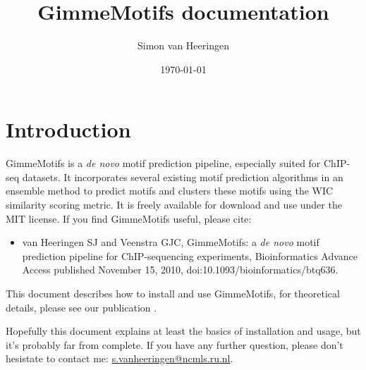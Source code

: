 \documentclass[11pt]{article}
\title{GimmeMotifs documentation}
\author{Simon van Heeringen}
\date{\today}
\begin{document}
\maketitle

\clearpage

\tableofcontents

\section{Introduction}
GimmeMotifs is a \textit{de novo} motif prediction pipeline, especially suited for ChIP-seq datasets. It incorporates several existing motif prediction algorithms in an ensemble method to predict motifs and clusters these motifs using the WIC similarity scoring metric. It is freely available for download and use under the MIT license. If you find GimmeMotifs useful, please cite:
\begin{itemize}
\item van Heeringen SJ and Veenstra GJC, GimmeMotifs: a \textit{de novo} motif prediction pipeline for ChIP-sequencing experiments, Bioinformatics Advance Access published November 15, 2010,
doi:10.1093/bioinformatics/btq636.
\end{itemize}
This document describes how to install and use GimmeMotifs, for theoretical details, please see our publication \cite{van_heeringen_gimmemotifs:_2010}.

Hopefully this document explains at least the basics of installation and usage, but it's probably far from complete. If you have any further question, please don't hesistate to contact me: \url{s.vanheeringen@ncmls.ru.nl}.
\end{document}
